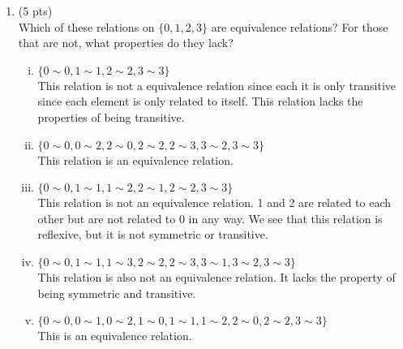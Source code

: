 \documentclass[12pt]{article}
\begin{document}
\begin{enumerate}
\item (5 pts) \\
Which of these relations on $\{0, 1, 2, 3\}$ are equivalence relations? For those that are not, what  properties do they lack?
\begin{enumerate}[(i)]
	\item $\{ 0 \sim 0 , 1 \sim 1 , 2 \sim 2 , 3 \sim 3\}$
	\\This relation is not a equivalence relation since each it is only transitive since each element is only related to itself. This relation lacks the properties of being transitive.
	\item $\{ 0 \sim 0 , 0 \sim 2 , 2 \sim 0 , 2 \sim 2 , 2 \sim 3 , 3 \sim 2 , 3 \sim 3\}$
	\\This relation is an equivalence relation.
	\item $\{ 0 \sim 0 , 1 \sim 1 , 1 \sim 2 , 2 \sim 1 , 2 \sim 2 , 3 \sim 3\}$
	\\This relation is not an equivalence relation. 1 and 2 are related to each other but are not related to 0 in any way. We see that this relation is reflexive, but it is not symmetric or transitive.
	\item $\{ 0 \sim 0 , 1 \sim 1 , 1 \sim 3 , 2 \sim 2 , 2 \sim 3 , 3 \sim 1 , 3 \sim 2 , 3 \sim 3\}$
	\\This relation is also not an equivalence relation. It lacks the property of being symmetric and transitive.

	\item $\{ 0 \sim 0 , 0 \sim 1 , 0 \sim 2 , 1 \sim 0 , 1 \sim 1 , 1 \sim 2 , 2 \sim 0 , 2 \sim 2 , 3 \sim 3\}$
    \\This is an equivalence relation.
\end{enumerate}	



\end{enumerate}
\end{document}
